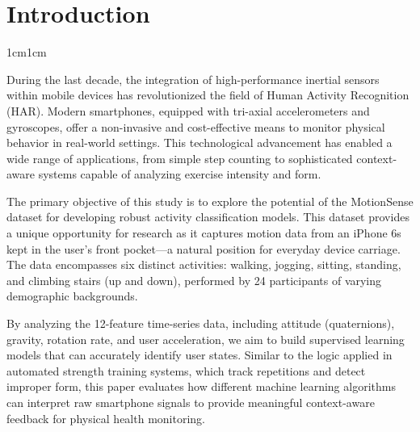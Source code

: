 \documentclass[11pt,a4paper]{article}
\begin{document}
\section{Introduction}
\begin{adjustwidth}{1cm}{1cm}

During the last decade, the integration of high-performance inertial sensors within mobile devices has revolutionized the field of Human Activity Recognition (HAR). Modern smartphones, equipped with tri-axial accelerometers and gyroscopes, offer a non-invasive and cost-effective means to monitor physical behavior in real-world settings. This technological advancement has enabled a wide range of applications, from simple step counting to sophisticated context-aware systems capable of analyzing exercise intensity and form.

The primary objective of this study is to explore the potential of the MotionSense dataset for developing robust activity classification models. This dataset provides a unique opportunity for research as it captures motion data from an iPhone 6s kept in the user's front pocket—a natural position for everyday device carriage. The data encompasses six distinct activities: walking, jogging, sitting, standing, and climbing stairs (up and down), performed by 24 participants of varying demographic backgrounds.

By analyzing the 12-feature time-series data, including attitude (quaternions), gravity, rotation rate, and user acceleration, we aim to build supervised learning models that can accurately identify user states. Similar to the logic applied in automated strength training systems, which track repetitions and detect improper form, this paper evaluates how different machine learning algorithms can interpret raw smartphone signals to provide meaningful context-aware feedback for physical health monitoring.
\end{adjustwidth}
\end{document}
